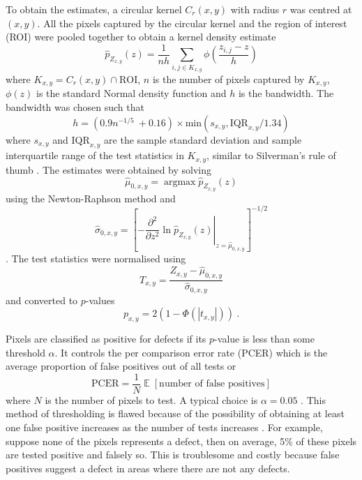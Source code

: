 \documentclass{article}
\DeclareMathOperator*{\argmax}{argmax}
\DeclareMathOperator{\expectation}{\mathbb{E}}
\begin{document}
To obtain the estimates, a circular kernel $C_r(x,y)$ with radius $r$ was centred at $(x,y)$. All the pixels captured by the circular kernel and the region of interest (ROI) were pooled together to obtain a kernel density estimate \citep{friedman2001elements, parzen1962on}
\begin{equation}
\widehat{p}_{Z_{x,y}}(z) =
\frac{1}{nh}
  \sum_{i,j\in K_{x,y}}\phi\left(
    \dfrac{z_{i,j}-z}{h}
  \right)
\end{equation}
where $K_{x,y} = C_r(x,y) \cap \text{ROI}$, $n$ is the number of pixels captured by $K_{x,y}$, $\phi(z)$ is the standard Normal density function and $h$ is the bandwidth. The bandwidth was chosen such that
\begin{equation}
  h = (0.9n^{-1/5}\ + 0.16) \times \text{min}\left(s_{x,y},\text{IQR}_{x,y}/1.34\right)
  \label{eq:inference_ourruleofthumb}
\end{equation}
where $s_{x,y}$ and $\text{IQR}_{x,y}$ are the sample standard deviation and sample interquartile range of the test statistics in $K_{x,y}$, similar to Silverman's rule of thumb \citep{sheather2004density, silverman1986density}. The estimates were obtained by solving
\begin{equation}
\widehat\mu_{0,x,y} = \argmax\widehat{p}_{Z_{x,y}}(z)
\end{equation}
using the Newton-Raphson method and
\begin{equation}
  \widehat{\sigma}_{0,x,y} = \left[
    \left.
      -\dfrac{\partial^2}{\partial z^2}\ln\widehat{p}_{Z_{x,y}}(z)
    \right|_{z=\widehat{\mu}_{0,x,y}}
  \right]^{-1/2}
\end{equation}
\citep{efron2004large}. The test statistics were normalised using
\begin{equation}
  T_{x,y} =
  \dfrac{
    Z_{x,y}-\widehat{\mu}_{0,x,y}
  }
  {
    \widehat{\sigma}_{0,x,y}
  }
\end{equation}
and converted to $p$-values
\begin{equation}
  p_{x,y} = 2(1-\Phi(|t_{x,y}|)) \ .
\end{equation}

Pixels are classified as positive for defects if its $p$-value is less than some threshold $\alpha$. It controls the per comparison error rate (PCER) \citep{benjamini1995controlling} which is the average proportion of false positives out of all tests or
\begin{equation}
\text{PCER}=\dfrac{1}{N}\expectation\left[\text{number of false positives}\right]
\end{equation}
where $N$ is the number of pixels to test. A typical choice is $\alpha=0.05$ \citep{wasserstein2019moving}. This method of thresholding is flawed because of the possibility of obtaining at least one false positive increases as the number of tests increases \citep{shaffer1995multiple}. For example, suppose none of the pixels represents a defect, then on average, 5\% of these pixels are tested positive and falsely so. This is troublesome and costly because false positives suggest a defect in areas where there are not any defects.
\end{document}
